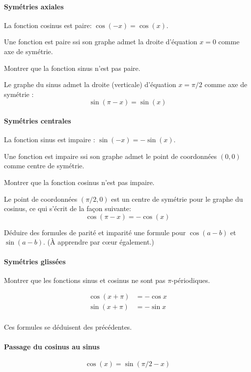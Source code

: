 \paragraph{Symétries axiales}

La fonction cosinus est paire: $ \cos(-x)=\cos(x)$.
\begin{remarque}
Une fonction est paire ssi son graphe admet la droite d'équation $x=0$ comme axe de symétrie.
\end{remarque}
\begin{exo}
Montrer que la fonction sinus n'est pas paire.
\end{exo}

Le graphe du sinus admet la droite (verticale) d'équation $x=\pi/2$ comme axe de symétrie :
\[ \sin(\pi-x)=\sin(x) \]

\paragraph{Symétries centrales}

La fonction sinus est impaire : $\sin(-x)=-\sin(x)$.
\begin{remarque}
Une fonction est impaire ssi son graphe admet le point de coordonnées $(0,0)$ comme centre de symétrie.
\end{remarque}
\begin{exo}
Montrer que la fonction cosinus n'est pas impaire.
\end{exo}

Le point de coordonnées $(\pi/2,0)$ est un centre de symétrie pour le graphe du cosinus, ce qui s'écrit de la façon suivante:
\[ \cos(\pi-x)=-\cos(x)\]


\begin{exo}
Déduire des formules de parité et imparité une formule pour $\cos(a-b)$ et $\sin(a-b)$. (À apprendre par c\oe ur également.)
\end{exo}

\paragraph{Symétries glissées}
\begin{exo}
Montrer que les fonctions sinus et cosinus ne sont pas $\pi$-périodiques.
\end{exo}

\begin{align*}
\cos(x+\pi) &= -\cos x\\
\sin(x+\pi) &= -\sin x\\
\end{align*}

Ces formules se déduisent des précédentes.

\paragraph{Passage du cosinus au sinus}

\[ \cos(x)=\sin(\pi/2-x)\]



